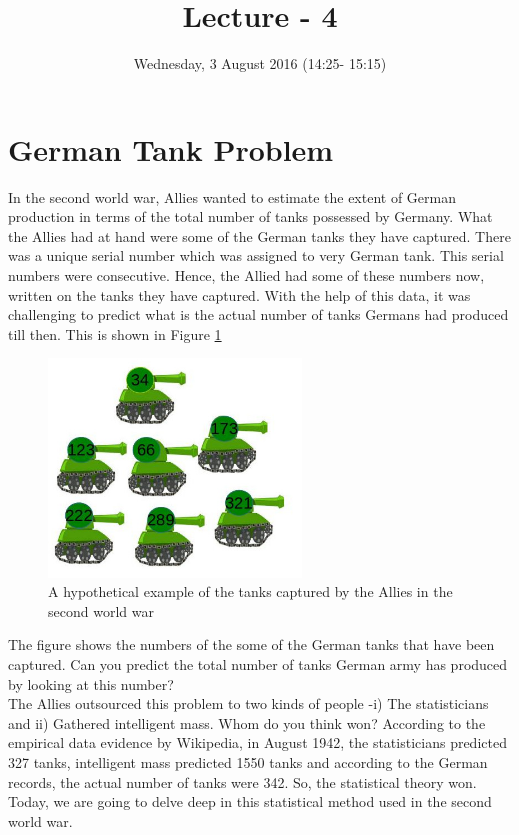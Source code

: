 \documentclass{llncs}
\title{Lecture - 4}
\author{Wednesday, 3 August 2016 (14:25- 15:15)}
\institute{\textbf{German Tank Problem}}
\begin{document}
\maketitle
\vspace{1cm}
\section{German Tank Problem}

In the second world war, Allies wanted to estimate the extent of German production in terms of the total number of tanks possessed by Germany. What the Allies had at hand were some of the German tanks they have captured. There was a unique serial number which was assigned to very German tank. This serial numbers were consecutive. Hence, the Allied had some of these numbers now, written on the tanks they have captured. With the help of this data, it was challenging to predict what is the actual number of tanks Germans had produced till then. This is shown in Figure \ref{tanks}\\ 
\begin{figure}[h!]
\centering
\includegraphics[width=0.6\textwidth]{german_tank.jpg}
\caption{A hypothetical example of the tanks captured by the Allies in the second world war}
\label{tanks}
\end{figure}
The figure shows the numbers of the some of the German tanks that have been captured. Can you predict the total number of tanks German army has produced by looking at this number? \\

The Allies outsourced this problem to two kinds of people -i) The statisticians and ii) Gathered intelligent mass. Whom do you think won? According to the empirical data evidence by Wikipedia, in August 1942, the statisticians predicted 327 tanks, intelligent mass predicted 1550 tanks and according to the German records, the actual number of tanks were 342. So, the statistical theory won. Today, we are going to delve deep in this statistical method used in the second world war. \\
\end{document}
